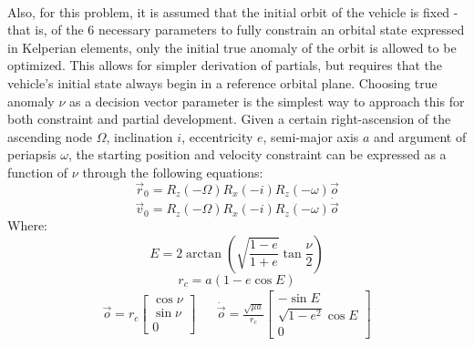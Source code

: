 \paragraph{}
Also, for this problem, it is assumed that the initial orbit of the vehicle is fixed - that is, of the 6 necessary parameters to fully constrain an orbital state expressed in Kelperian elements, only the initial true anomaly of the orbit is allowed to be optimized. This allows for simpler derivation of partials, but requires that the vehicle's initial state always begin in a reference orbital plane. Choosing true anomaly $\nu$ as a decision vector parameter is the simplest way to approach this for both constraint and partial development. Given a certain right-ascension of the ascending node $\Omega$, inclination $i$, eccentricity $e$, semi-major axis $a$ and argument of periapsis $\omega$, the starting position and velocity constraint can be expressed as a function of $\nu$ through the following equations:
\begin{equation}\label{eq:state0pos}
\vec{r}_0 = R_z (-\Omega) R_x(-i) R_z(-\omega) \vec{o}
\end{equation}
\begin{equation}\label{eq:state0vel}
\vec{v}_0 = R_z (-\Omega) R_x(-i) R_z(-\omega) \dot{\vec{o}}
\end{equation}
Where:
\begin{equation}
E = 2 \arctan{\left(\sqrt{\frac{1-e}{1+e}} \tan{\frac{\nu}{2}}\right)}
\end{equation}
\begin{equation}
r_c = a(1 - e \cos{E})
\end{equation}
\begin{align}
\vec{o} = r_c \begin{bmatrix}
\cos {\nu} \\ \sin {\nu} \\ 0
\end{bmatrix} &&
\dot{\vec{o}} = \frac{\sqrt{\mu a}}{r_c} 
\begin{bmatrix}
-\sin {E} \\ \sqrt{1 - e^2} \cos{E} \\ 0
\end{bmatrix}
\end{align}
